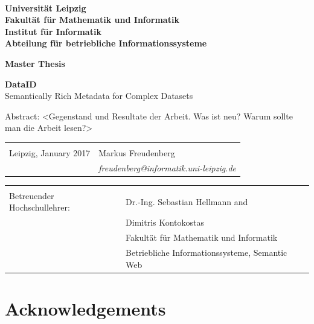 \documentclass[a4paper,english,twoside,BCOR1.5cm,headsepline,DIV12,appendixprefix,final,12pt]{scrbook}
\begin{document}
\thispagestyle{empty}

\begin{center}
\large
~\\
\vspace{1cm}
\textbf{\sffamily	Universität Leipzig\\
			Fakultät für Mathematik und Informatik\\
			Institut für Informatik\\
			Abteilung für betriebliche Informationssysteme\\}

\vspace{3cm}
{\Large\textbf{\sffamily Master Thesis }}


\large
\textbf{DataID}\\ Semantically Rich Metadata for Complex Datasets
\vspace{1cm}
\end{center}

Abstract: <Gegenstand und Resultate der Arbeit. Was ist neu? Warum sollte man die Arbeit lesen?>

\vfill

{\large
\begin{tabular}{p{7cm} l}
&\\
\small
Leipzig, January 2017	& \small Markus Freudenberg \\
						& \small\textit{freudenberg@informatik.uni-leipzig.de}\\
\end{tabular}}

\begin{tabular}{p{7cm} l}
&\\
\small
Betreuender Hochschullehrer: 	& \small Dr.-Ing. Sebastian Hellmann and\\
								& \small Dimitris Kontokostas \\
				& \small Fakultät für Mathematik und Informatik\\
				& \small Betriebliche Informationssysteme, Semantic Web
\end{tabular} 


\newpage
\thispagestyle{empty}

\section*{Acknowledgements}

\cleardoublepage{}
\tableofcontents{}

\listoffigures
\end{document}
